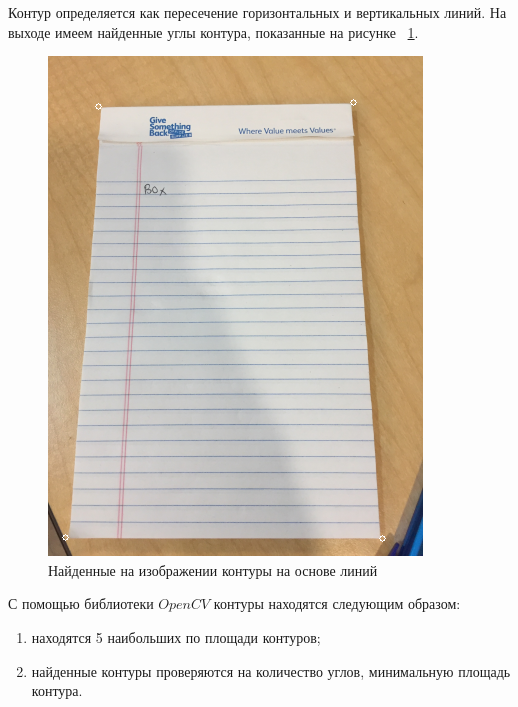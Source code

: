 Контур определяется как пересечение горизонтальных и вертикальных линий. На выходе имеем найденные углы контура, показанные на рисунке ~\ref{lsd_corners}.
\begin{figure}
    \includegraphics[scale=0.25]{img/perspective/corners.png}
    \caption{Найденные на изображении контуры на основе линий}
    \label{lsd_corners}
\end{figure}

С помощью библиотеки $OpenCV$ контуры находятся следующим образом:

\begin{enumerate}
    \item находятся 5 наибольших по площади контуров;
    \item найденные контуры проверяются на количество углов, минимальную площадь контура.
\end{enumerate}

